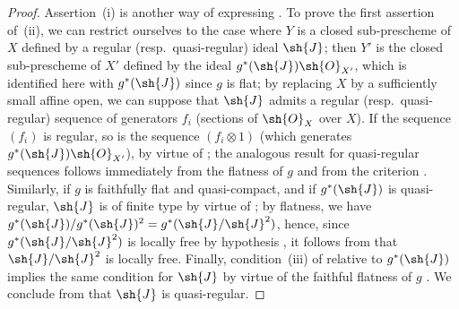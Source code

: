 \begin{proof}
Assertion~(i) is another way of expressing .
To prove the first assertion of~(ii), we can restrict ourselves to the case where $Y$ is a closed sub-prescheme of $X$ defined by a regular (resp.\ quasi-regular) ideal $\sh{J}$; then $Y'$ is the closed sub-prescheme of $X'$ defined by the ideal $g^*(\sh{J})\sh{O}_{X'}$, which is identified here with $g^*(\sh{J})$ since $g$ is flat; by replacing $X$ by a sufficiently small affine open, we can suppose that $\sh{J}$ admits a regular (resp.\ quasi-regular) sequence of generators $f_i$ (sections of $\sh{O}_X$ over $X$).
If the sequence $(f_i)$ is regular, so is the sequence $(f_i\otimes 1)$ (which generates $g^*(\sh{J})\sh{O}_{X'}$), by virtue of ; the analogous result for quasi-regular sequences follows immediately from the flatness of $g$ and from the criterion .
Similarly, if $g$ is faithfully flat and quasi-compact, and if $g^*(\sh{J})$ is quasi-regular, $\sh{J}$ is of finite type by virtue of ; by flatness, we have $g^*(\sh{J})/g^*(\sh{J})^2=g^*(\sh{J}/\sh{J}^2)$, hence, since $g^*(\sh{J}/\sh{J}^2)$ is locally free by hypothesis , it follows from  that $\sh{J}/\sh{J}^2$ is locally free.
Finally, condition~(iii) of  relative to $g^*(\sh{J})$ implies the same condition for $\sh{J}$ by virtue of the faithful flatness of $g$ .
We conclude from  that $\sh{J}$ is quasi-regular.


\end{proof}
